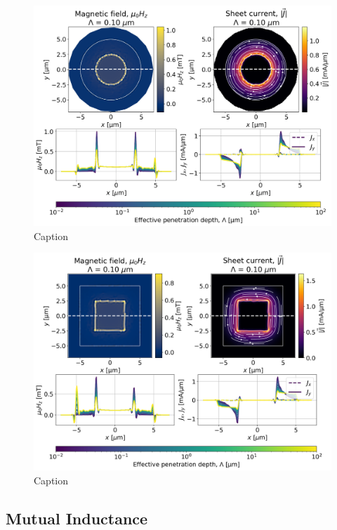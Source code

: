\documentclass[preprint,12pt]{elsarticle}
\begin{document}
\begin{figure}
    \centering
    \includegraphics[scale=.40]{examples/images/ring/ring_circulating_current.png}
    \caption{Caption}
    \label{fig:ring_circ_current}
\end{figure}

\begin{figure}
    \centering
    \includegraphics[scale=.40]{examples/images/ring/square_ring_circulating_current.png}
    \caption{Caption}
    \label{fig:square_ring_circ_current}
\end{figure}

\subsection{Mutual Inductance}
\label{section:examples:mutual-inductance}
\end{document}
